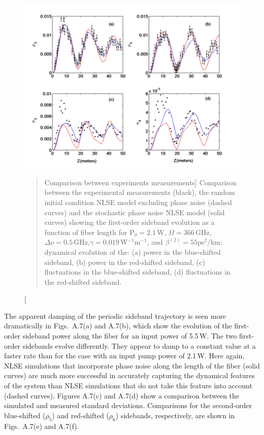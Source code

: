 \begin{figure}
\begin{center}
\includegraphics[width=5in]{nlsez21phaseornot.pdf}
\end{center}
\renewcommand{\baselinestretch}{1}
\small\normalsize
\begin{quote}
\caption
[Comparison between experiments measurements]
{Comparison between the experimental measurements \cite{hart1}(black), the random initial condition NLSE model excluding phase noise (dashed curves) and the stochastic phase noise NLSE model (solid curves) showing the first-order sideband evolution as a function of fiber length for P$_{0} = 2.1$\,W, $\Omega = 366$\,GHz, $\Delta\nu = 0.5$\,GHz,$\gamma = 0.019$\,W$^{-1}$m$^{-1}$, and $\beta^{(2)} = 55$ps$^2$/km: dynamical evolution of the: (a) power in the blue-shifted sideband, (b) power in the red-shifted sideband, (c) fluctuations in the blue-shifted sideband, (d) fluctuations in the red-shifted sideband.}
\label{figA.6}
\end{quote}
\end{figure}
\renewcommand{\baselinestretch}{2}
\small\normalsize

The apparent damping of the periodic sideband trajectory is seen more
dramatically in Figs.\ A.7(a) and A.7(b), which show the evolution of the
first-order sideband power along the fiber for an input power of 5.5\,W.
The two first-order sidebands evolve differently. They appear to
damp to a constant value at a faster rate than for the case with an input pump
power of 2.1\,W. Here again, NLSE simulations that incorporate phase noise along the length
of the fiber (solid curves) are much more successful in accurately capturing the dynamical features of the system than NLSE simulations that do not take this feature into account (dashed curves).  Figures A.7(c) and A.7(d) show a comparison between the simulated and measured standard deviations. Comparisons for the second-order blue-shifted ($\rho_5$) and red-shifted ($\rho_6$) sidebands, respectively, are shown in Figs.\ A.7(e) and A.7(f).


